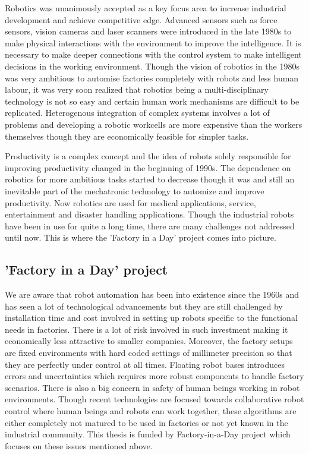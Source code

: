 Robotics was unanimously accepted as a key focus area to increase industrial development and achieve competitive edge. Advanced sensors such as force sensors, vision cameras and laser scanners were introduced in the late 1980s
to make physical interactions with the environment to improve the intelligence. It is necessary to make deeper connections with the control system to make intelligent decisions in the working environment. Though the vision of robotics in the 1980s was very ambitious to automise factories completely with robots and less human labour, it was very soon realized that robotics being a multi-disciplinary technology is not so easy and certain human work mechanisms are difficult to be replicated. Heterogenous integration of complex systems involves a lot of problems and developing a robotic workcells are more expensive than the workers themselves though they are economically feasible for simpler tasks.

Productivity is a complex concept and the idea of robots solely responsible for improving productivity changed in the beginning of 1990s. The dependence on robotics for more ambitious tasks started to decrease though it was and still an inevitable part of the mechatronic technology to automize and improve productivity. Now robotics are used for medical applications, service, entertainment and disaster handling applications. Though the industrial robots have been in use for quite a long time, there are many challenges not addressed until now. This is where the 'Factory in a Day' project comes into picture.

\subsection{'Factory in a Day' project}
We are aware that robot automation has been into existence since the 1960s and has seen a lot of technological advancements but they are still challenged by installation time and cost involved in setting up robots specific to the functional needs in factories. There is a lot of risk involved in such investment making it economically less attractive to smaller companies. Moreover, the factory setups are fixed environments with hard coded settings of millimeter precision so that they are perfectly under control at all times. Floating robot bases introduces errors and uncertainties which requires more robust components to handle factory scenarios. There is also a big concern in safety of human beings working in robot environments. Though recent technologies are focused towards collaborative robot control where human beings and robots can work together, these algorithms are either completely not matured to be used in factories or not yet known in the industrial community. This thesis is funded by Factory-in-a-Day project which focuses on these issues mentioned above.

